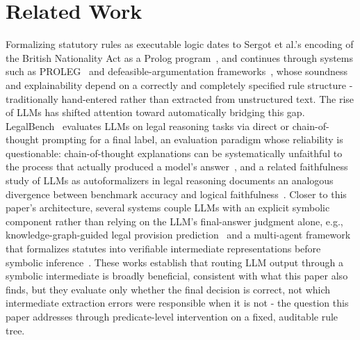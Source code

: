 \section{Related Work}
\label{sec:related}

Formalizing statutory rules as executable logic dates to Sergot et al.'s encoding of the British Nationality Act as a Prolog program~\cite{sergot1986}, and continues through systems such as PROLEG~\cite{satoh2010proleg} and defeasible-argumentation frameworks~\cite{benchcapon2007,prakken2020}, whose soundness and explainability depend on a correctly and completely specified rule structure - traditionally hand-entered rather than extracted from unstructured text. The rise of LLMs has shifted attention toward automatically bridging this gap. LegalBench~\cite{guha2023legalbench} evaluates LLMs on legal reasoning tasks via direct or chain-of-thought prompting for a final label, an evaluation paradigm whose reliability is questionable: chain-of-thought explanations can be systematically unfaithful to the process that actually produced a model's answer~\cite{turpin2023unfaithful}, and a related faithfulness study of LLMs as autoformalizers in legal reasoning documents an analogous divergence between benchmark accuracy and logical faithfulness~\cite{wang2026knowyourlimits}. Closer to this paper's architecture, several systems couple LLMs with an explicit symbolic component rather than relying on the LLM's final-answer judgment alone, e.g., knowledge-graph-guided legal provision prediction~\cite{li2021legalkg} and a multi-agent framework that formalizes statutes into verifiable intermediate representations before symbolic inference~\cite{sadowski2025verifiable}. These works establish that routing LLM output through a symbolic intermediate is broadly beneficial, consistent with what this paper also finds, but they evaluate only whether the final decision is correct, not which intermediate extraction errors were responsible when it is not - the question this paper addresses through predicate-level intervention on a fixed, auditable rule tree.
